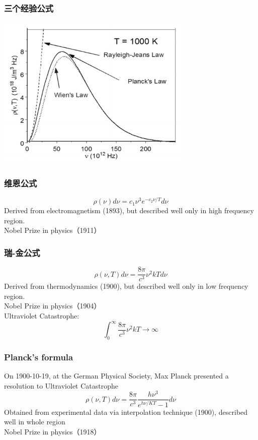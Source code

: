 \begin{frame}
    \frametitle{三个经验公式}
    \begin{center}
        \includegraphics[width=0.7\textwidth]{figs/threelaws.png}
    \end{center}
\end{frame}

\begin{frame}
    \frametitle{维恩公式}
    \begin{equation*}
        \rho(\nu) d \nu=c_{1} \nu^{3} e^{-c_{2} \nu / T} d \nu 
    \end{equation*}
    Derived from electromagnetism (1893), but described well only in high frequency region.\\ 
    {\color{deepred} Nobel Prize in physics（1911）}\\
\end{frame}

\begin{frame}
    \frametitle{瑞-金公式}
    \begin{equation*}
        \rho(\nu, T) d \nu=\frac{8 \pi}{c^{3}} \nu^{2} k T d \nu 
    \end{equation*}
    Derived from thermodynamics (1900), but described well only in low frequency region.\\ 
   {\color{deepred} Nobel Prize in physics（1904）}\\
   {\color{deepblue} Ultraviolet Catastrophe:} 
    \begin{equation*}
         \int_0 ^\infty \frac{8 \pi}{c^{3}} \nu^{2} k T \to \infty 
    \end{equation*}
\end{frame}

\begin{frame}
    \frametitle{Planck's formula}
    On 1900-10-19, at the German Physical Society, 
    Max Planck presented a resolution to {\color{deepblue} Ultraviolet Catastrophe} 
    \begin{equation}
        \rho(\nu, T) d \nu=\frac{8 \pi}{c^{3}} \frac{h \nu^{3}}{e^{h \nu / K T}-1} d \nu
    \end{equation}
    Obtained from experimental data via interpolation technique (1900), described well in whole region \\
    {\color{deepred} Nobel Prize in physics（1918）}\\
\end{frame}

